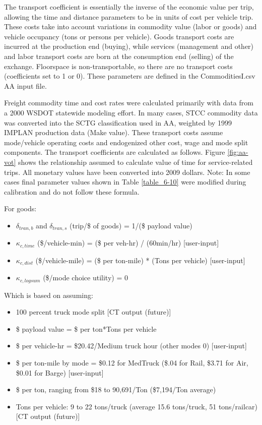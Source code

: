 The transport coefficient is essentially the inverse of the economic value per trip, allowing the time and distance parameters to be in units of cost per vehicle trip. These costs take into account variations in commodity value (labor or goods) and vehicle occupancy (tons or persons per vehicle). Goods transport costs are incurred at the production end (buying), while services (management and other) and labor transport costs are born at the consumption end (selling) of the exchange. Floorspace is non-transportable, so there are no transport costs (coefficients set to 1 or 0). These parameters are defined in the CommoditiesI.csv AA input file.

Freight commodity time and cost rates were calculated primarily with data from a 2000 WSDOT statewide modeling effort. In many cases, STCC commodity data was converted into the SCTG classification used in AA, weighted by 1999 IMPLAN production data (Make value). These transport costs assume mode/vehicle operating costs and endogenized other cost, wage and mode split components. The transport coefficients are calculated as follows. Figure \ref{fig:aa-vot} shows the relationship assumed to calculate value of time for service-related trips. All monetary values have been converted into 2009 dollars. Note: In some cases final parameter values shown in Table \ref{table_6-10} were modified during calibration and do not follow these formula.

\vspace{10pt}
\noindent For goods:
\begin{itemize}
\item $\delta_{tran,b}$ and $\delta_{tran,s}$ (trip/\$ of goods) = 1/(\$ payload value)
\item $\kappa_{c,time}$ (\$/vehicle-min) = (\$ per veh-hr) / (60min/hr) [user-input]
\item $\kappa_{c,dist}$ (\$/vehicle-mile) =  (\$ per ton-mile) * (Tons per vehicle) [user-input]
\item $\kappa_{c,logsum}$ (\$/mode choice utility) = 0
\end{itemize}

\noindent Which is based on assuming:
\begin{itemize}
\item 100 percent truck mode split [CT output (future)]
\item \$ payload value = \$ per ton*Tons per vehicle
\item \$ per vehicle-hr = \$20.42/Medium truck hour (other modes 0) [user-input]
\item \$ per ton-mile by mode = \$0.12 for MedTruck (\$.04 for Rail, \$3.71 for Air, \$0.01 for 
Barge) [user-input]
\item \$ per ton, ranging from \$18 to 90,691/Ton  (\$7,194/Ton average) 
\item Tons per vehicle: 9 to 22 tons/truck (average 15.6 tons/truck, 51 tons/railcar) [CT 
output (future)]
\end{itemize}

